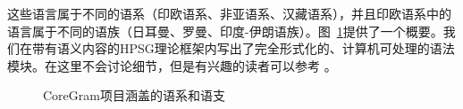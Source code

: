 \noindent
	这些语言属于不同的语系（印欧语系、非亚语系、汉藏语系），并且印欧语系中的语言属于不同的语族（日耳曼、罗曼、印度-伊朗语族）。图~\ref{fig-lang-fams}提供了一个概要。我们在带有语义内容的HPSG\indexhpsgc 理论框架内写出了完全形式化的、计算机可处理的语法模块。在这里不会讨论细节，但是有兴趣的读者可以参考 。
%
\begin{figure}
\caption{CoreGram项目涵盖的语系和语支}\label{fig-lang-fams}
\end{figure}%

